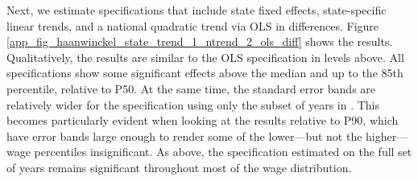 \clearpage


Next, we estimate specifications that include state fixed effects, state-specific linear trends, and a national quadratic trend via OLS in differences. %
Figure \ref{app_fig_haanwinckel_state_trend_1_ntrend_2_ols_diff} shows the results. Qualitatively, the results are similar to the OLS specification in levels above. All specifications show some significant effects above the median and up to the 85th percentile, relative to P50. At the same time, the standard error bands are relatively wider for the specification using only the subset of years in . This becomes particularly evident when looking at the results relative to P90, which have error bands large enough to render some of the lower---but not the higher---wage percentiles insignificant. As above, the specification estimated on the full set of years remains significant throughout most of the wage distribution.


